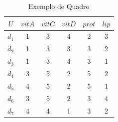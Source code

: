 \begin{table}[h!]
  \begin{center}
    \caption{Exemplo de Quadro} 
    \label{tab:exemplo}
    \begin{tabular}{c c c c c c }
      \hline
      $U$ & \multicolumn{1}{|c}{$vitA$} & \multicolumn{1}{|c}{$vitC$} & \multicolumn{1}{|c}{$vitD$} & \multicolumn{1}{|c}{$prot$} & \multicolumn{1}{|c}{$lip$} \\
      \hline
      $d_1$ & 1 & 3 & 4 & 2 & 3\\
      $d_2$ & 1 & 3 & 3 & 3 & 2\\
      $d_3$ & 1 & 3 & 4 & 3 & 1\\
      $d_4$ & 3 & 5 & 2 & 5 & 2\\
      $d_5$ & 4 & 5 & 2 & 5 & 1\\
      $d_6$ & 3 & 5 & 2 & 3 & 4\\
      $d_7$ & 4 & 4 & 1 & 3 & 2\\
      \hline 
    \end{tabular}
  \end{center}
\end{table}

